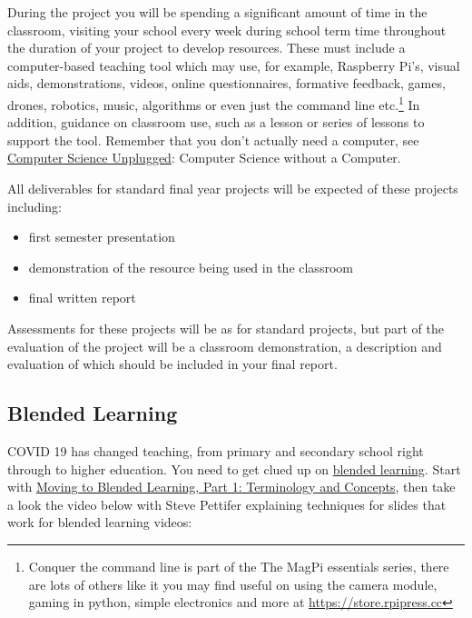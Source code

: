 \documentclass[
  12pt,
]{book}
\providecommand{\tightlist}{%
  \setlength{\itemsep}{0pt}\setlength{\parskip}{0pt}}
\begin{document}
During the project you will be spending a significant amount of time in the classroom, visiting your school every week during school term time throughout the duration of your project to develop resources. These must include a computer-based teaching tool which may use, for example, Raspberry Pi's, visual aids, demonstrations, videos, online questionnaires, formative feedback, games, drones, robotics, music, \citep{Aaron2016} algorithms \citep{Kubica2012} or even just the command line \citep{conquerthecommandline} etc.\footnote{Conquer the command line is part of the The MagPi essentials series, there are lots of others like it you may find useful on using the camera module, gaming in python, simple electronics and more at \url{https://store.rpipress.cc}} In addition, guidance on classroom use, such as a lesson or series of lessons to support the tool. Remember that you don't actually need a computer, see \href{https://csunplugged.org}{Computer Science Unplugged}: Computer Science without a Computer. \citep{Bell2018}

All deliverables for standard final year projects will be expected of these projects including:

\begin{itemize}
\tightlist
\item
  first semester presentation
\item
  demonstration of the resource being used in the classroom
\item
  final written report
\end{itemize}

Assessments for these projects will be as for standard projects, \citep{COMP30030, COMP30040} but part of the evaluation of the project will be a classroom demonstration, a description and evaluation of which should be included in your final report.

\hypertarget{blended}{%
\subsection{Blended Learning}\label{blended}}

COVID 19 has changed teaching, from primary and secondary school right through to higher education. You need to get clued up on \href{https://en.wikipedia.org/wiki/Blended_learning}{blended learning}. Start with \href{http://www.elearning.fse.manchester.ac.uk/fseta/moving-to-blended-learning-part-1-terminology-and-concepts/}{Moving to Blended Learning, Part 1: Terminology and Concepts}, then take a look the video below with Steve Pettifer explaining techniques for slides that work for blended learning videos:
\end{document}
